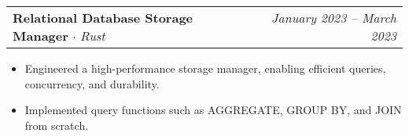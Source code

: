 \documentclass[letterpaper,11pt]{article}
\makeatletter
\newcommand{\resumeItem}[1]{
  \item\small{
    {#1 \vspace{-2pt}}
  }
}
\newcommand{\resumeProjectHeading}[2]{
    \item
    \begin{tabular*}{0.97\textwidth}{l@{\extracolsep{\fill}}r}
      \small#1 & #2 \\
    \end{tabular*}\vspace{-7pt}
}
\newcommand{\resumeItemListStart}{\begin{itemize}[leftmargin=0.185in]
}
\newcommand{\resumeItemListEnd}{\end{itemize}\vspace{-5pt}}
\makeatother
\begin{document}
      
      \resumeProjectHeading
          {\textbf{Relational Database Storage Manager} $\cdot$ \emph{Rust}}{\emph{January 2023 -- March 2023}}
          \resumeItemListStart
             \resumeItem{Engineered a high-performance storage manager, enabling efficient queries, concurrency, and durability.}
            \resumeItem{Implemented query functions such as AGGREGATE, GROUP BY, and JOIN from scratch.}
             
          \resumeItemListEnd


    
  
\end{document}
